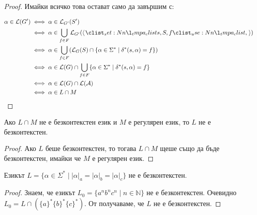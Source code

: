 \begin{proof}
    Имайки всичко това остават само да завършим с:

    \begin{align*}
        \alpha \in \mathcal{L}(G') & \iff \alpha \in \mathcal{L}_{G'}(S')                                                                                    \\
                                   & \iff \alpha \in \bigcup\limits_{f \in F} \mathcal{L}_{G'}(\opair{s, S, f})                                              \\
                                   & \iff \alpha \in \bigcup\limits_{f \in F} (\mathcal{L}_G(S) \cap \{ \alpha \in \Sigma^* \mid \delta^*(s, \alpha) = f \}) \\
                                   & \iff \alpha \in \mathcal{L}(G) \cap \bigcup\limits_{f \in F} \{ \alpha \in \Sigma^* \mid \delta^*(s, \alpha) = f \}     \\
                                   & \iff \alpha \in \mathcal{L}(G) \cap \mathcal{L(A)}                                                                      \\
                                   & \iff \alpha \in L \cap M
    \end{align*}
\end{proof}

\begin{corollary}
    Ако $L \cap M$ не е безконтекстен език и $M$ е регулярен език, то $L$ не е безконтекстен.
\end{corollary}

\begin{proof}
    Ако $L$ беше безконтекстен, то тогава $L \cap M$ щеше също да бъде безконтекстен, имайки че $M$ е регулярен език.
\end{proof}

\begin{claim}
    Езикът $L = \{ \alpha \in \Sigma^* \mid |\alpha|_a = |\alpha|_b = |\alpha|_c \}$ не е безконтекстен.
\end{claim}

\begin{proof}
    Знаем, че езикът $L_0 = \{ a^nb^nc^n \mid n \in \mathbb{N} \}$ не е безконтекстен.
    Очевидно $L_0 = L \cap (\{ a \}^* \{ b \}^* \{ c \}^*)$.
    От  получаваме, че $L$ не е безконтекстен.
\end{proof}